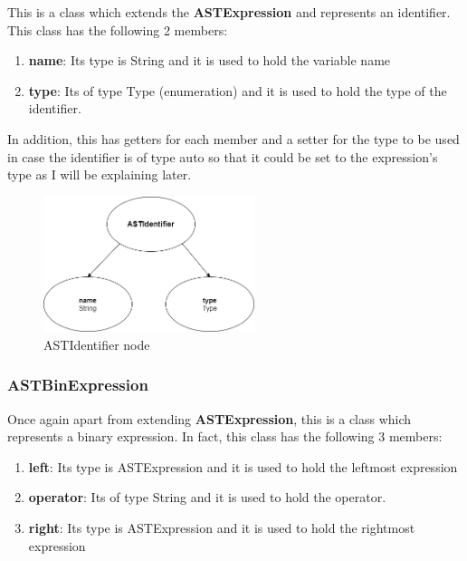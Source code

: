 \documentclass{article}
\begin{document}
					This is a class which extends the \textbf{ASTExpression} and represents an identifier. This class has the following 2 members: 
					\begin{enumerate}
					\item \textbf{name}: Its type is String and it is used to hold the variable name
					\item \textbf{type}: Its of type Type (enumeration) and it is used to hold the type of the identifier.
				
					\end{enumerate}
			In addition, this has getters for each member and a setter for the type to be used in case the identifier is of type auto so that it could be set to the expression's type as I will be explaining later.
					
					\begin{figure}[H]
					\centering
			 			\includegraphics[width=0.55\textwidth]{astidentifier.png}
			  			\caption{ASTIdentifier node}
			  			\label{fig:astidentifier}
					\end{figure}
					
					\subsubsection{ASTBinExpression}
					Once again apart from extending \textbf{ASTExpression}, this is a class which represents a binary expression. In fact, this class has the following 3 members:
					
					\begin{enumerate}
					\item \textbf{left}: Its type is ASTExpression and it is used to hold the leftmost expression
					\item \textbf{operator}: Its of type String and it is used to hold the operator.
					\item \textbf{right}: Its type is ASTExpression and it is used to hold the rightmost expression
					\end{enumerate}
				
\end{document}

